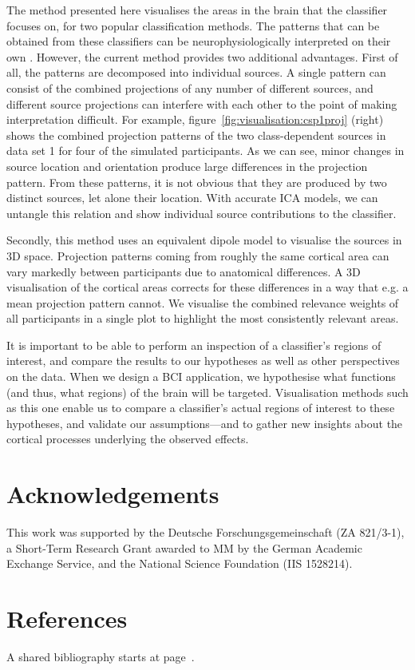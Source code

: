 The method presented here visualises the areas in the brain that the classifier focuses on, for two popular classification methods. The patterns that can be obtained from these classifiers can be neurophysiologically interpreted on their own \cite{haufe2014}. However, the current method provides two additional advantages. First of all, the patterns are decomposed into individual sources. A single pattern can consist of the combined projections of any number of different sources, and different source projections can interfere with each other to the point of making interpretation difficult. For example, figure~\ref{fig:visualisation:csp1proj} (right) shows the combined projection patterns of the two class-dependent sources in data set 1 for four of the simulated participants. As we can see, minor changes in source location and orientation produce large differences in the projection pattern. From these patterns, it is not obvious that they are produced by two distinct sources, let alone their location. With accurate ICA models, we can untangle this relation and show individual source contributions to the classifier. 

Secondly, this method uses an equivalent dipole model to visualise the sources in 3D space. Projection patterns coming from roughly the same cortical area can vary markedly between participants due to anatomical differences. A 3D visualisation of the cortical areas corrects for these differences in a way that e.g. a mean projection pattern cannot. We visualise the combined relevance weights of all participants in a single plot to highlight the most consistently relevant areas.

It is important to be able to perform an inspection of a classifier's regions of interest, and compare the results to our hypotheses as well as other perspectives on the data. When we design a BCI application, we hypothesise what functions (and thus, what regions) of the brain will be targeted. Visualisation methods such as this one enable us to compare a classifier's actual regions of interest to these hypotheses, and validate our assumptions---and to gather new insights about the cortical processes underlying the observed effects.


\section*{Acknowledgements}

This work was supported by the Deutsche Forschungsgemeinschaft (ZA 821/3-1), a Short-Term Research Grant awarded to MM by the German Academic Exchange Service, and the National Science Foundation (IIS 1528214).


\section*{References}

A shared bibliography starts at page~\pageref{bibliography}.


\clearpage
\pagestyle{plain}
